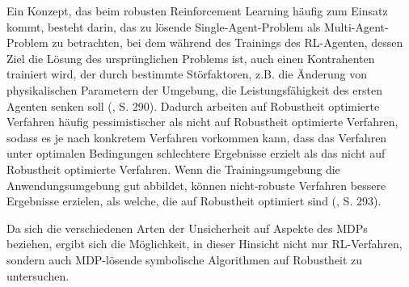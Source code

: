 Ein Konzept, das beim robusten Reinforcement Learning häufig zum Einsatz kommt, besteht darin, das zu lösende Single-Agent-Problem als Multi-Agent-Problem zu betrachten, bei dem während des Trainings des RL-Agenten, dessen Ziel die Lösung des ursprünglichen Problems ist, auch einen Kontrahenten trainiert wird, der durch bestimmte Störfaktoren, z.B. die Änderung von physikalischen Parametern der Umgebung, die Leistungsfähigkeit des ersten Agenten senken soll (\cite{Moos.2022}, S. 290). Dadurch arbeiten auf Robustheit optimierte Verfahren häufig pessimistischer als nicht auf Robustheit optimierte Verfahren, sodass es je nach konkretem Verfahren vorkommen kann, dass das Verfahren unter optimalen Bedingungen schlechtere Ergebnisse erzielt als das nicht auf Robustheit optimierte Verfahren. Wenn die Trainingsumgebung die Anwendungsumgebung gut abbildet, können nicht-robuste Verfahren bessere Ergebnisse erzielen, als welche, die auf Robustheit optimiert sind (\cite{Moos.2022}, S. 293).

Da sich die verschiedenen Arten der Unsicherheit auf Aspekte des MDPs beziehen, ergibt sich die Möglichkeit, in dieser Hinsicht nicht nur RL-Verfahren, sondern auch MDP-lösende symbolische Algorithmen auf Robustheit zu untersuchen.
